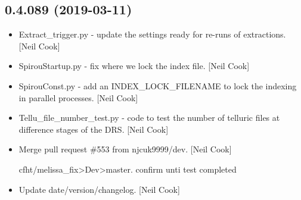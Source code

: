 \documentclass[a4paper,10pt,english]{report}
\begin{document}
\subsection{0.4.089 (2019-03-11)}
\label{\detokenize{misc/changelog:id170}}\begin{itemize}
\item {} 
Extract\_trigger.py - update the settings ready for re-runs of
extractions. {[}Neil Cook{]}

\item {} 
SpirouStartup.py - fix where we lock the index file. {[}Neil Cook{]}

\item {} 
SpirouConst.py - add an INDEX\_LOCK\_FILENAME to lock the indexing in
parallel processes. {[}Neil Cook{]}

\item {} 
Tellu\_file\_number\_test.py - code to test the number of telluric files
at difference stages of the DRS. {[}Neil Cook{]}

\item {} 
Merge pull request \#553 from njcuk9999/dev. {[}Neil Cook{]}

cfht/melissa\_fix\textendash{}\textgreater{}Dev\textendash{}\textgreater{}master. confirm unti test completed

\item {} 
Update date/version/changelog. {[}Neil Cook{]}

\end{itemize}
\end{document}
